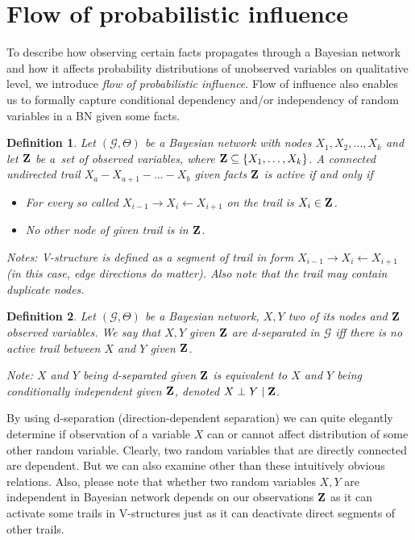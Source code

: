 \documentclass[english,cover]{fitthesis} %
\newtheorem{math_def}{Definition}[chapter] %
\newcommand{\term}[1]{\emph{#1}}           %
\newcommand{\vars}[1]{{\bold{#1}}}         %
\begin{document}
\section{Flow of probabilistic influence}
To describe how observing certain facts propagates through a Bayesian network and how it affects probability distributions of unobserved variables on qualitative level, we introduce \term{flow of probabilistic influence}. Flow of influence also enables us to formally capture conditional dependency and/or independency of random variables in a BN given some facts.
\begin{math_def}
    Let $(\mathcal{G}, \Theta)$ be a Bayesian network with nodes $X_1, X_2, \dots, X_k$ and let $\vars{Z}$ be a~set of observed variables, where $\vars{Z} \subseteq \lbrace X_1, \dots, X_k \rbrace$. A connected undirected trail $X_a - X_{a+1} - \dots - X_b$ given facts $\vars{Z}$ is active if and only if
    \begin{itemize}
        \item For every so called  $X_{i-1} \rightarrow X_i \leftarrow X_{i+1}$ on the trail is $X_i \in \vars{Z}$.
        \item No other node of given trail is in $\vars{Z}$.
    \end{itemize}
    Notes: V-structure is defined as a segment of trail in form $X_{i-1} \rightarrow X_i \leftarrow X_{i+1}$ (in this case, edge directions do matter). Also note that the trail may contain duplicate nodes.
\end{math_def}

\begin{math_def}
    Let $(\mathcal{G}, \Theta)$ be a Bayesian network, $X,Y$ two of its nodes and $\vars{Z}$ observed variables. We say that $X,Y$ given $\vars{Z}$ are d-separated in $\mathcal{G}$ iff there is no active trail between $X$ and $Y$ given $\vars{Z}$.
    
    Note: $X$ and $Y$ being d-separated given $\vars{Z}$ is equivalent to $X$ and $Y$ being conditionally independent given $\vars{Z}$, denoted $X \perp Y \mid \vars{Z}$.
\end{math_def}

By using d-separation (direction-dependent separation) we can quite elegantly determine if observation of a variable $X$ can or cannot affect distribution of some other random variable. Clearly, two random variables that are directly connected are dependent. But we can also examine other than these intuitively obvious relations. Also, please note that whether two random variables $X,Y$ are independent in Bayesian network depends on our observations $\vars{Z}$ as it can activate some trails in V-structures just as it can deactivate direct segments of other trails.
\end{document}

